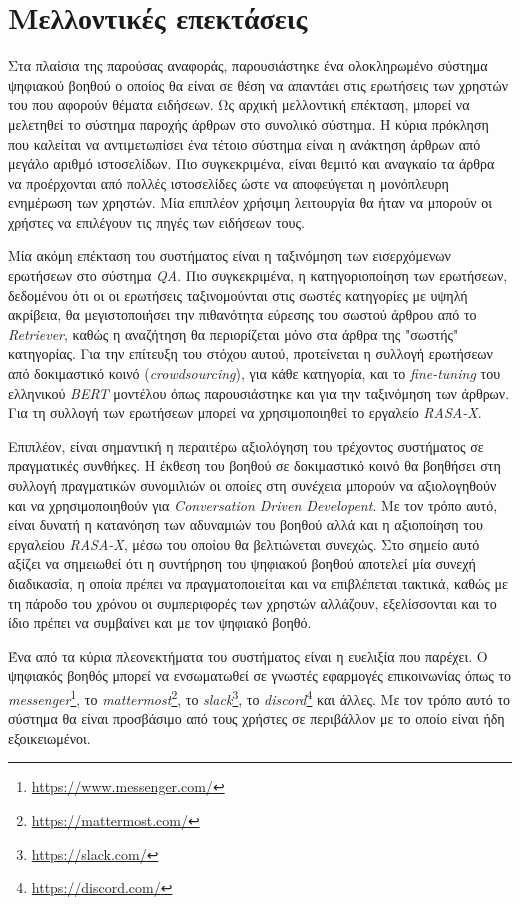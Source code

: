 \chapter{Μελλοντικές επεκτάσεις}
\label{chapter:future_work}
Στα πλαίσια της παρούσας αναφοράς, παρουσιάστηκε ένα ολοκληρωμένο σύστημα ψηφιακού βοηθού ο οποίος θα είναι σε θέση να απαντάει στις ερωτήσεις των χρηστών του που αφορούν θέματα ειδήσεων. Ως αρχική μελλοντική επέκταση, μπορεί να μελετηθεί το σύστημα παροχής άρθρων στο συνολικό σύστημα. Η κύρια πρόκληση που καλείται να αντιμετωπίσει ένα τέτοιο σύστημα είναι η ανάκτηση άρθρων από μεγάλο αριθμό ιστοσελίδων. Πιο συγκεκριμένα, είναι θεμιτό και αναγκαίο τα άρθρα να προέρχονται από πολλές ιστοσελίδες ώστε να αποφεύγεται η μονόπλευρη ενημέρωση των χρηστών. Μία επιπλέον χρήσιμη λειτουργία θα ήταν να μπορούν οι χρήστες να επιλέγουν τις πηγές των ειδήσεων τους.

Μία ακόμη επέκταση του συστήματος είναι η ταξινόμηση των εισερχόμενων ερωτήσεων στο σύστημα \emph{QA}. Πιο συγκεκριμένα, η κατηγοριοποίηση των ερωτήσεων, δεδομένου ότι οι οι ερωτήσεις ταξινομούνται στις σωστές κατηγορίες με υψηλή ακρίβεια, θα μεγιστοποιήσει την πιθανότητα εύρεσης του σωστού άρθρου από το \emph{Retriever}, καθώς η αναζήτηση θα περιορίζεται μόνο στα άρθρα της "σωστής" κατηγορίας. Για την επίτευξη του στόχου αυτού, προτείνεται η συλλογή ερωτήσεων από δοκιμαστικό κοινό (\emph{crowdsourcing}), για κάθε κατηγορία, και το \emph{fine-tuning} του ελληνικού \emph{BERT} μοντέλου όπως παρουσιάστηκε και για την ταξινόμηση των άρθρων. Για τη συλλογή των ερωτήσεων μπορεί να χρησιμοποιηθεί το εργαλείο \emph{RASA-X}.

Επιπλέον, είναι σημαντική η περαιτέρω αξιολόγηση του τρέχοντος συστήματος σε πραγματικές συνθήκες. Η έκθεση του βοηθού σε δοκιμαστικό κοινό θα βοηθήσει στη συλλογή πραγματικών συνομιλιών οι οποίες στη συνέχεια μπορούν να αξιολογηθούν και να χρησιμοποιηθούν για \emph{Conversation Driven Developent}. Με τον τρόπο αυτό, είναι δυνατή η κατανόηση των αδυναμιών του βοηθού αλλά και η αξιοποίηση του εργαλείου \emph{RASA-X}, μέσω του οποίου θα βελτιώνεται συνεχώς. Στο σημείο αυτό αξίζει να σημειωθεί ότι η συντήρηση του ψηφιακού βοηθού αποτελεί μία συνεχή διαδικασία, η οποία πρέπει να πραγματοποιείται και να επιβλέπεται τακτικά, καθώς με τη πάροδο του χρόνου οι συμπεριφορές των χρηστών αλλάζουν, εξελίσσονται και το ίδιο πρέπει να συμβαίνει και με τον ψηφιακό βοηθό.

Ένα από τα κύρια πλεονεκτήματα του συστήματος είναι η ευελιξία που παρέχει. Ο ψηφιακός βοηθός μπορεί να ενσωματωθεί σε γνωστές εφαρμογές επικοινωνίας όπως το \emph{messenger}\footnote{\url{https://www.messenger.com/}}, το \emph{mattermost}\footnote{\url{https://mattermost.com/}}, το \emph{slack}\footnote{\url{https://slack.com/}}, το \emph{discord}\footnote{\url{https://discord.com/}} και άλλες. Με τον τρόπο αυτό το σύστημα θα είναι προσβάσιμο από τους χρήστες σε περιβάλλον με το οποίο είναι ήδη εξοικειωμένοι.

